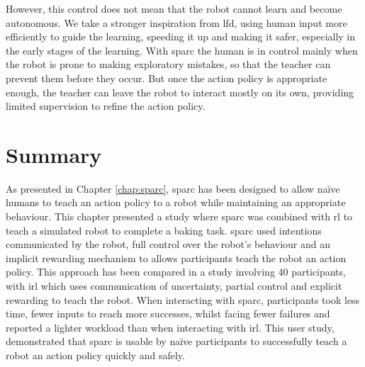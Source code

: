 However, this control does not mean that the robot cannot learn and become autonomous. We take a stronger inspiration from \gls{lfd}, using human input more efficiently to guide the learning, speeding it up and making it safer, especially in the early stages of the learning. With \gls{sparc} the human is in control mainly when the robot is prone to making exploratory mistakes, so that the teacher can prevent them before they occur. But once the action policy is appropriate enough, the teacher can leave the robot to interact mostly on its own, providing limited supervision to refine the action policy.


\section{Summary}

As presented in Chapter \ref{chap:sparc}, \gls{sparc} has been designed to allow na\"ive humans to teach an action policy to a robot while maintaining an appropriate behaviour. This chapter presented a study where \gls{sparc} was combined with \gls{rl} to teach a simulated robot to complete a baking task. \gls{sparc} used intentions communicated by the robot, full control over the robot's behaviour and an implicit rewarding mechanism to allows participants teach the robot an action policy. This approach has been compared in a study involving 40 participants, with \gls{irl} which uses communication of uncertainty, partial control and explicit rewarding to teach the robot. When interacting with \gls{sparc}, participants took less time, fewer inputs to reach more successes, whilst facing fewer failures and reported a lighter workload than when interacting with \gls{irl}. This user study, demonstrated that \gls{sparc} is usable by na\"ive participants to successfully teach a robot an action policy quickly and safely.

